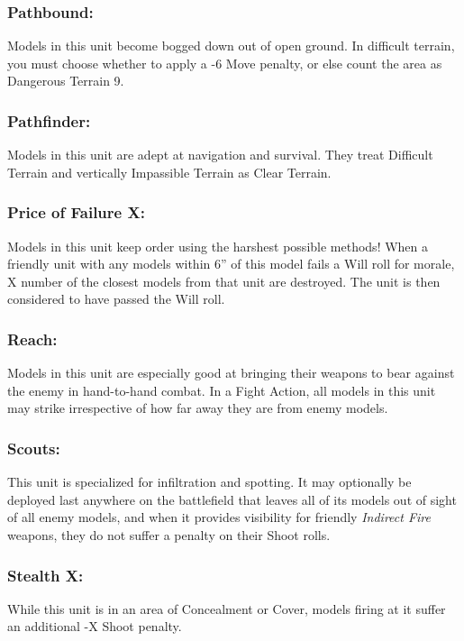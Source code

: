 \begin{multicols}{2}
\subsubsection*{Pathbound:} Models in this unit become bogged down out of open ground. In difficult terrain, you must choose whether to apply a -6 Move penalty, or else count the area as Dangerous Terrain 9.

\subsubsection*{Pathfinder:} Models in this unit are adept at navigation and survival. They treat Difficult Terrain and vertically Impassible Terrain as Clear Terrain.

\subsubsection*{Price of Failure X:} Models in this unit keep order using the harshest possible methods! When a friendly unit with any models within 6'' of this model fails a Will roll for morale, X number of the closest models from that unit are destroyed. The unit is then considered to have passed the Will roll.

\subsubsection*{Reach:} Models in this unit are especially good at bringing their weapons to bear against the enemy in hand-to-hand combat. In a Fight Action, all models in this unit may strike irrespective of how far away they are from enemy models.

\subsubsection*{Scouts:} This unit is specialized for infiltration and spotting. It may optionally be deployed last anywhere on the battlefield that leaves all of its models out of sight of all enemy models, and when it provides visibility for friendly \textit{Indirect Fire} weapons, they do not suffer a penalty on their Shoot rolls.

\subsubsection*{Stealth X:} While this unit is in an area of Concealment or Cover, models firing at it suffer an additional -X Shoot penalty.


\end{multicols}
